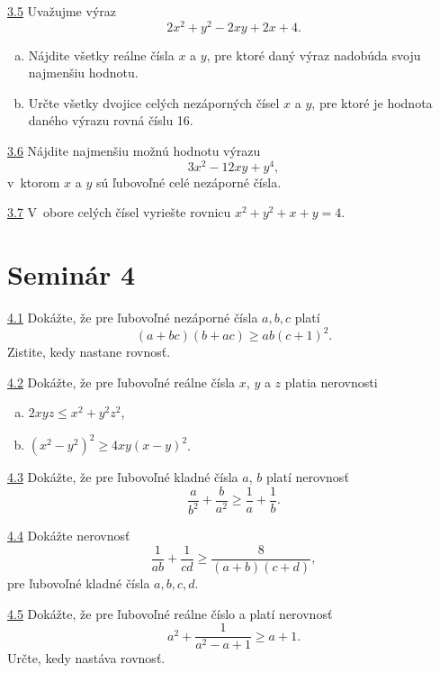 \noindent \ul{3.5}  Uvažujme výraz $$2x^2+ y^2 - 2xy + 2x + 4.$$
\begin{enumerate}[a)]

\item Nájdite všetky reálne čísla $x$ a $y$, pre ktoré daný výraz nadobúda svoju najmenšiu hodnotu.

\item Určte všetky dvojice celých nezáporných čísel $x$ a $y$, pre ktoré je hodnota daného výrazu rovná číslu 16.
\end{enumerate}



\noindent \ul{3.6}  Nájdite najmenšiu možnú hodnotu výrazu $$3x^2 - 12xy + y^4,$$
v~ktorom $x$ a $y$ sú ľubovoľné celé nezáporné čísla.




\noindent \ul{3.7}  V~obore celých čísel vyriešte rovnicu $x^2+ y^2+ x + y = 4$.




\section*{Seminár 4}

\noindent \ul{4.1} 
Dokážte, že pre ľubovoľné nezáporné čísla $a, b, c$ platí $$(a + bc)(b + ac) \geq ab(c + 1)^2.$$
Zistite, kedy nastane rovnosť.




\noindent \ul{4.2}  Dokážte, že pre ľubovoľné reálne čísla $x$, $y$ a $z$ platia nerovnosti
\begin{enumerate}[a)]
\item $2xyz \leq x^2+ y^2z^2$,
\item $(x^2-y^2)^2\geq 4xy(x - y)^2$.
\end{enumerate}





\noindent \ul{4.3}  Dokážte, že pre ľubovoľné kladné čísla $a$, $b$ platí nerovnosť $$\frac{a}{b^2}+ \frac{b}{a^2}\geq \frac{1}{a} + \frac{1}{b}.$$




\noindent \ul{4.4}  Dokážte nerovnosť $$\frac{1}{ab}+\frac{1}{cd}\geq \frac{8}{(a+b)(c+d)},$$ pre ľubovoľné kladné čísla $a, b, c, d$.




\noindent \ul{4.5}  Dokážte, že pre ľubovoľné reálne číslo a platí nerovnosť $$a^2+\frac{1}{a^2-a+1}\geq a+1.$$ Určte, kedy nastáva rovnosť.




